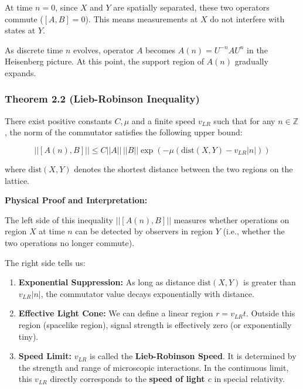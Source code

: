 \documentclass[11pt,a4paper,twoside]{book}
\begin{document}
At time \textbf{$n=0$}, since \textbf{$X$} and \textbf{$Y$} are spatially separated, these two operators commute (\textbf{$[A, B] = 0$}). This means measurements at \textbf{$X$} do not interfere with states at \textbf{$Y$}.

As discrete time \textbf{$n$} evolves, operator \textbf{$A$} becomes \textbf{$A(n) = U^{-n} A U^n$} in the Heisenberg picture. At this point, the support region of \textbf{$A(n)$} gradually expands.

\subsubsection{Theorem 2.2 (Lieb-Robinson Inequality)}

There exist positive constants \textbf{$C, \mu$} and a finite speed \textbf{$v_{LR}$} such that for any \textbf{$n \in \mathbb{Z}$}, the norm of the commutator satisfies the following upper bound:

$$|| [A(n), B] || \le C ||A|| \, ||B|| \exp\left(-\mu \left( \text{dist}(X, Y) - v_{LR} |n| \right)\right)$$

where \textbf{$\text{dist}(X, Y)$} denotes the shortest distance between the two regions on the lattice.

\textbf{Physical Proof and Interpretation:}

The left side of this inequality \textbf{$|| [A(n), B] ||$} measures whether operations on region \textbf{$X$} at time \textbf{$n$} can be detected by observers in region \textbf{$Y$} (i.e., whether the two operations no longer commute).

The right side tells us:

\begin{enumerate}
\item \textbf{Exponential Suppression:} As long as distance \textbf{$\text{dist}(X, Y)$} is greater than \textbf{$v_{LR} |n|$}, the commutator value decays exponentially with distance.

\item \textbf{Effective Light Cone:} We can define a linear region \textbf{$r = v_{LR} t$}. Outside this region (spacelike region), signal strength is effectively zero (or exponentially tiny).

\item \textbf{Speed Limit:} \textbf{$v_{LR}$} is called the \textbf{Lieb-Robinson Speed}. It is determined by the strength and range of microscopic interactions. In the continuous limit, this \textbf{$v_{LR}$} directly corresponds to the \textbf{speed of light $c$} in special relativity.
\end{enumerate}
\end{document}
